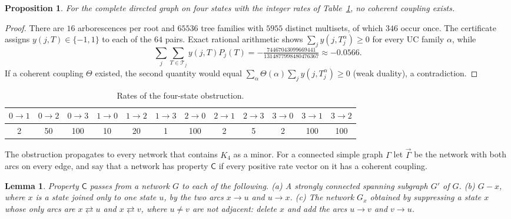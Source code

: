 \documentclass[11pt]{amsart}
\newtheorem{lemma}[theorem]{Lemma}
\newtheorem{proposition}[theorem]{Proposition}
\theoremstyle{definition}
\theoremstyle{remark}
\newcommand{\T}{\mathcal T}
\begin{document}
\begin{proposition}\label{prop:k4}
For the complete directed graph on four states with the integer rates of Table~\ref{tab:k4}, no coherent coupling exists.
\end{proposition}

\begin{proof}
There are $16$ arborescences per root and $65536$ tree families with $5955$ distinct multisets, of which $346$ occur once. The certificate assigns $y(j,T)\in\{-1,1\}$ to each of the $64$ pairs. Exact rational arithmetic shows $\sum_jy(j,T^\alpha_j)\ge0$ for every UC family $\alpha$, while
\[
 \sum_j\sum_{T\in\T_j}y(j,T)P_j(T)=-\tfrac{74467043099669441}{1314877998480476367}\approx-0.0566.
\]
If a coherent coupling $\Theta$ existed, the second quantity would equal $\sum_\alpha\Theta(\alpha)\sum_jy(j,T^\alpha_j)\ge0$ (weak duality), a contradiction.
\end{proof}

\begin{table}[ht]
\centering\small
\begin{tabular}{cccccccccccc}
\toprule
$0{\to}1$&$0{\to}2$&$0{\to}3$&$1{\to}0$&$1{\to}2$&$1{\to}3$&$2{\to}0$&$2{\to}1$&$2{\to}3$&$3{\to}0$&$3{\to}1$&$3{\to}2$\\
\midrule
2&50&100&10&20&1&100&2&5&2&100&100\\
\bottomrule
\end{tabular}
\caption{Rates of the four-state obstruction.}
\label{tab:k4}
\end{table}

The obstruction propagates to every network that contains $K_4$ as a minor. For a connected simple graph $\Gamma$ let $\vec\Gamma$ be the network with both arcs on every edge, and say that a network has property $\mathsf{C}$ if every positive rate vector on it has a coherent coupling.

\begin{lemma}\label{lem:minor}
Property $\mathsf{C}$ passes from a network $G$ to each of the following.
(a) A strongly connected spanning subgraph $G'$ of $G$.
(b) $G-x$, where $x$ is a state joined only to one state $u$, by the two arcs $x\to u$ and $u\to x$.
(c) The network $G_x$ obtained by suppressing a state $x$ whose only arcs are $x\rightleftarrows u$ and $x\rightleftarrows v$, where $u\neq v$ are not adjacent: delete $x$ and add the arcs $u\to v$ and $v\to u$.
\end{lemma}
\end{document}
